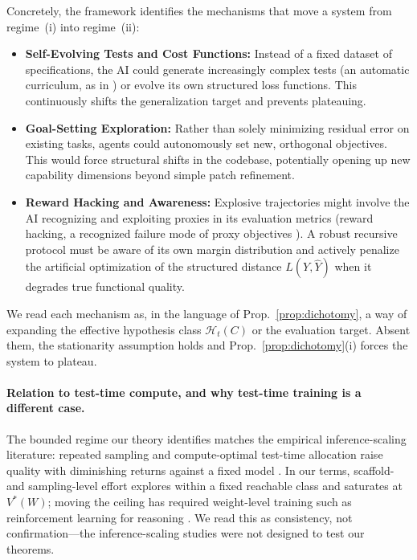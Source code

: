 Concretely, the framework identifies the mechanisms that move a system from regime~(i) into regime~(ii):
\begin{itemize}[leftmargin=*,itemsep=2pt]
    \item \textbf{Self-Evolving Tests and Cost Functions:} Instead of a fixed dataset of specifications, the AI could generate increasingly complex tests (an automatic curriculum, as in \citealp{wang2023voyager}) or evolve its own structured loss functions. This continuously shifts the generalization target and prevents plateauing.
    \item \textbf{Goal-Setting Exploration:} Rather than solely minimizing residual error on existing tasks, agents could autonomously set new, orthogonal objectives. This would force structural shifts in the codebase, potentially opening up new capability dimensions beyond simple patch refinement.
    \item \textbf{Reward Hacking and Awareness:} Explosive trajectories might involve the AI recognizing and exploiting proxies in its evaluation metrics (reward hacking, a recognized failure mode of proxy objectives \citealp{amodei2016concrete, skalse2022defining}). A robust recursive protocol must be aware of its own margin distribution and actively penalize the artificial optimization of the structured distance $L(Y, \hat{Y})$ when it degrades true functional quality.
\end{itemize}
We read each mechanism as, in the language of Prop.~\ref{prop:dichotomy}, a way of expanding the effective hypothesis class $\mathcal{H}_t(C)$ or the evaluation target. Absent them, the stationarity assumption holds and Prop.~\ref{prop:dichotomy}(i) forces the system to plateau.

\paragraph{Relation to test-time compute, and why test-time training is a different case.} The bounded regime our theory identifies matches the empirical inference-scaling literature: repeated sampling and compute-optimal test-time allocation raise quality with diminishing returns against a fixed model \citep{brown2024monkeys, snell2024scaling, wu2024inference}. In our terms, scaffold- and sampling-level effort explores within a fixed reachable class and saturates at $V^*(W)$; moving the ceiling has required weight-level training such as reinforcement learning for reasoning \citep{deepseek2025r1}. We read this as consistency, not confirmation---the inference-scaling studies were not designed to test our theorems.

